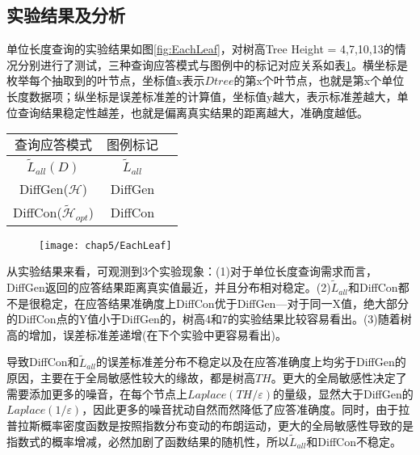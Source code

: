 
\subsection{实验结果及分析}

单位长度查询的实验结果如图\ref{fig:EachLeaf}，对树高Tree Height = 4,7,10,13的情况分别进行了测试，三种查询应答模式与图例中的标记对应关系如表\ref{chap5_table1}。横坐标是枚举每个抽取到的叶节点，坐标值x表示$Dtree$的第x个叶节点，也就是第x个单位长度数据项；纵坐标是误差标准差的计算值，坐标值y越大，表示标准差越大，单位查询结果稳定性越差，也就是偏离真实结果的距离越大，准确度越低。

\begin{table}[!hpb]
	\label{chap5_table1}
	\centering
		\begin{tabular}{|c|c|c|}
			\hline
			$\textbf{查询应答模式}$ & $\textbf{图例标记}$\\
			\hline
			$\tilde{L}_{all}(D)$ & $\tilde{L}_{all}$ \\
			\hline
			DiffGen($\mathcal{H}$) & DiffGen \\
			\hline
			DiffCon($\tilde{\mathcal{H}}_{opt}$) & DiffCon \\
			\hline
		\end{tabular}
\end{table}


\begin{figure}[!htp]
	\centering
	\texttt{[image: chap5/EachLeaf]}
\end{figure}

从实验结果来看，可观测到3个实验现象：(1)对于单位长度查询需求而言，DiffGen返回的应答结果距离真实值最近，并且分布相对稳定。(2)$\tilde{L}_{all}$和DiffCon都不是很稳定，在应答结果准确度上DiffCon优于DiffGen---对于同一X值，绝大部分的DiffCon点的Y值小于DiffGen的，树高4和7的实验结果比较容易看出。(3)随着树高的增加，误差标准差递增(在下个实验中更容易看出)。

导致DiffCon和$\tilde{L}_{all}$的误差标准差分布不稳定以及在应答准确度上均劣于DiffGen的原因，主要在于全局敏感性较大的缘故，都是树高$TH$。更大的全局敏感性决定了需要添加更多的噪音，在每个节点上$Laplace(TH/\varepsilon)$的量级，显然大于DiffGen的$Laplace(1/\varepsilon)$，因此更多的噪音扰动自然而然降低了应答准确度。同时，由于拉普拉斯概率密度函数是按照指数分布变动的布朗运动，更大的全局敏感性导致的是指数式的概率增减，必然加剧了函数结果的随机性，所以$\tilde{L}_{all}$和DiffCon不稳定。

